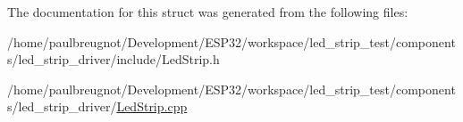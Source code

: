The documentation for this struct was generated from the following files\+:\begin{DoxyCompactItemize}
\item 
/home/paulbreugnot/\+Development/\+E\+S\+P32/workspace/led\+\_\+strip\+\_\+test/components/led\+\_\+strip\+\_\+driver/include/Led\+Strip.\+h\item 
/home/paulbreugnot/\+Development/\+E\+S\+P32/workspace/led\+\_\+strip\+\_\+test/components/led\+\_\+strip\+\_\+driver/\mbox{\hyperlink{LedStrip_8cpp}{Led\+Strip.\+cpp}}\end{DoxyCompactItemize}
